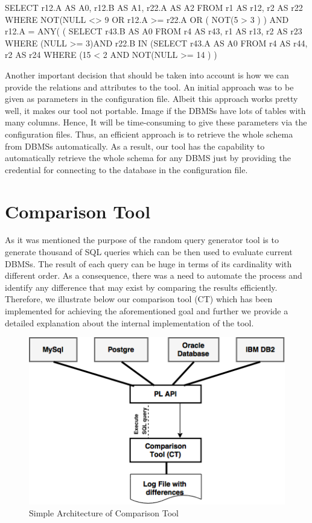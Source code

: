 SELECT r12.A AS A0, r12.B AS A1, r22.A AS A2 
FROM r1 AS r12, r2 AS r22
WHERE NOT(NULL <> 9 OR r12.A >= r22.A OR ( NOT(5 > 3 )  ) 
AND r12.A = ANY( (	SELECT r43.B AS A0
			FROM r4 AS r43, r1 AS r13, r2 AS r23
			WHERE (NULL >= 3)AND r22.B IN (SELECT r43.A AS A0
							FROM r4 AS r44, r2 AS r24
							WHERE (15 < 2 AND NOT(NULL >= 14 ) ) 



	Another important decision that should be taken into account is how we can provide the relations and attributes to the tool. An initial approach was to be given as parameters in the configuration file. Albeit this approach works pretty well, it makes our tool not portable. Image if the DBMSs have lots of tables with many columns. Hence, It will be time-consuming to give these parameters via the configuration files. Thus, an efficient approach is to retrieve the whole schema from DBMSs automatically. As a result, our tool has the capability to automatically retrieve the whole schema for any DBMS just by providing the credential for connecting to the database in the configuration file.

\section{Comparison Tool} 
As it was mentioned the purpose of the random query generator tool is to generate thousand of SQL queries which can be then used to evaluate current DBMSs. The result of each query can be huge in terms of its cardinality with different order. As a consequence, there was a need to automate the process and identify any difference that may exist by comparing the results efficiently. Therefore, we illustrate below our comparison tool (CT) which has been implemented for achieving the aforementioned goal and further we provide a detailed explanation about the internal implementation of the tool.  

 \begin{figure} 
      \centering
      \includegraphics[width=\textwidth]{Images/Chapter4/2-ComparisonTool}
      \caption{Simple Architecture of Comparison Tool}
      \label{fig:counting-methods}
  \end{figure}

